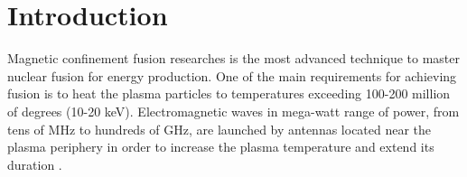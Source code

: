 \setchapterpreamble[u]{\margintoc}
\chapter{Introduction}

Magnetic confinement fusion researches is the most advanced technique to master nuclear fusion for energy production. One of the main requirements for achieving fusion is to heat the plasma particles to temperatures exceeding 100-200 million of degrees (10-20 keV). Electromagnetic waves in mega-watt range of power, from tens of MHz to hundreds of GHz, are launched by antennas located near the plasma periphery in order to increase the plasma temperature and extend its duration . 
